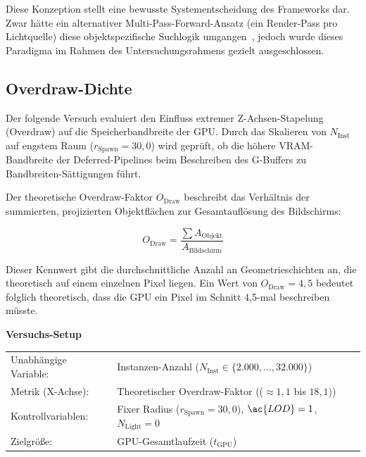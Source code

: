 Diese Konzeption stellt eine bewusste Systementscheidung des Frameworks dar.
Zwar hätte ein alternativer Multi-Pass-Forward-Ansatz (ein Render-Pass pro Lichtquelle) diese objektspezifische
Suchlogik umgangen~\parencite[vgl.][S.~1]{Thaler2011DeferredRendering}, jedoch wurde dieses Paradigma im Rahmen des
Untersuchungsrahmens gezielt ausgeschlossen.

\subsection{{Overdraw-Dichte}}
\label{subsec:050203_overdraw_eval}

Der folgende Versuch evaluiert den Einfluss extremer Z-Achsen-Stapelung (Overdraw) auf die Speicherbandbreite der
\ac{GPU}.
Durch das Skalieren von $N_{\text{Inst}}$ auf engstem Raum ($r_{\text{Spawn}} = 30{,}0$) wird geprüft, ob die höhere
\ac{VRAM}-Bandbreite der Deferred-Pipelines beim Beschreiben des \ac{G-Buffer}s zu Bandbreiten-Sättigungen führt.

Der theoretische Overdraw-Faktor $O_{\text{Draw}}$ beschreibt das Verhältnis der summierten, projizierten
Objektflächen zur Gesamtauflösung des Bildschirms:

\begin{equation}
    O_{\text{Draw}} = \frac{\sum A_{\text{Objekt}}}{A_{\text{Bildschirm}}}
\end{equation}

Dieser Kennwert gibt die durchschnittliche Anzahl an Geometrieschichten an, die theoretisch auf einem einzelnen
Pixel liegen.
Ein Wert von $O_{\text{Draw}} = 4{,}5$ bedeutet folglich theoretisch, dass die \ac{GPU} ein Pixel im Schnitt 4,5-mal
beschreiben müsste.

\begin{center}
    \small
    \colorbox{gray!5}{\parbox{0.95\textwidth}{
        \centering
        \vspace{2mm}
        {\sffamily\bfseries Versuchs-Setup} \\[1.5ex]
        \begin{tabularx}{0.9\textwidth}{>{\sffamily}l X}
            Unabhängige Variable:    & Instanzen-Anzahl ($N_{\text{Inst}} \in \{2.000, \dots, 32.000\}$) \\
            Metrik (X-Achse):    & Theoretischer Overdraw-Faktor (($\approx 1{,}1$ bis $18{,}1$)) \\
            Kontrollvariablen:       & Fixer Radius ($r_{\text{Spawn}} = 30{,}0$), $\ac{LOD} = 1$, $N_{\text{Light}} =
            0$ \\
            Zielgröße:               & \ac{GPU}-Gesamtlaufzeit ($t_{\text{GPU}}$)
        \end{tabularx}
        \vspace{2mm}
    }}
\end{center}

